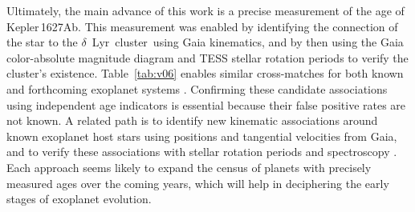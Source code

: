 \documentclass[12pt,modern,twocolumn,tighten,linenumbers]{aastex63}
\newcommand{\cn}{$\delta$\ Lyr\ cluster} %
\newcommand{\pn}{Kepler\,1627Ab} %
\begin{document}
Ultimately, the main advance of this work is a precise measurement of
the age of \pn.   This measurement was enabled by identifying the
connection of the star to the \cn\ using Gaia kinematics, and by then 
using the Gaia color-absolute magnitude diagram and TESS stellar
rotation periods to verify the cluster's existence.
Table~\ref{tab:v06} enables similar cross-matches for both known and
forthcoming exoplanet systems \citep[{\it
e.g.},][]{guerrero_tess_2021}. Confirming these candidate associations
using independent age indicators is essential because their false
positive rates are not known.  A related path is to identify new
kinematic associations around known exoplanet host stars using
positions and tangential velocities from Gaia, and to verify
these associations with stellar rotation periods and spectroscopy
\citep[{\it e.g.},][]{tofflemire_tess_2021}.  Each approach seems
likely to expand the census of planets with precisely measured ages
over the coming years, which will help in deciphering the early stages
of exoplanet evolution.




\acknowledgements
\raggedbottom
\end{document}
